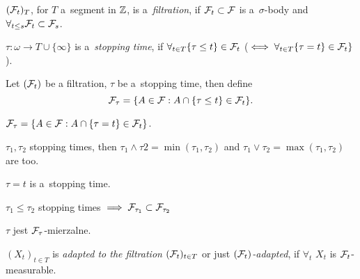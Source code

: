 



	\begin{definition}[filtration]
		$(\mathcal{F}_t)_T$, for $T$ a~segment in ${\mathbb{Z}}$, is a~\emph{filtration},
		if $\mathcal{F}_t \subset \mathcal{F}$ is a~$\sigma$-body and $\forall_{t \leq s} \mathcal{F}_t \subset \mathcal{F}_s$.
	\end{definition}
	
	\begin{definition}
		$\tau: \omega \to T \cup \{\infty\}$ is a~\emph{stopping time}, if
		$\forall_{t \in T} \{\tau \leq t\} \in \mathcal{F}_t$
		($\iff \forall_{t \in T} \{ \tau = t\} \in \mathcal{F}_t\}$).
	\end{definition}
	
	\begin{definition}
		Let $(\mathcal{F}_t)$ be a filtration, $\tau$ be a~stopping time, then define
		$$\mathcal{F}_\tau = \{ A \in \mathcal{F}: A \cap \{ \tau \leq t\} \in \mathcal{F}_t\}.$$
	\end{definition}
	
	\begin{proposition}
		$\mathcal{F}_\tau = \{ A \in \mathcal{F}: A \cap \{ \tau = t \} \in \mathcal{F}_t\}$.
	\end{proposition}
	
	\begin{proposition}
		$\tau_1, \tau_2$ stopping times, then $\tau_1 \wedge \tau2 = \min(\tau_1, \tau_2)$
		and $\tau_1 \vee \tau_2 = \max(\tau_1, \tau_2)$ are too.
		
		$\tau = t$ is a~stopping time.
		
		$\tau_1 \leq \tau_2$ stopping times $\implies \mathcal{F}_{\tau_1} \subset \mathcal{F}_{\tau_2}$
		
		$\tau$ jest $\mathcal{F}_\tau$-mierzalne.
	\end{proposition}
	
	\begin{definition}
		$(X_t)_{t \in T}$ is \emph{adapted to the filtration} $(\mathcal{F}_t)_{t \in T}$ or just \emph{$(\mathcal{F}_t)$-adapted}, if $\forall_t$ $X_t$ is $\mathcal{F}_t$-measurable.
	\end{definition}
	
